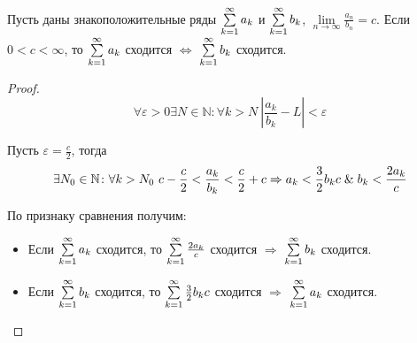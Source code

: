 \begin{theorem}
Пусть даны знакоположительные ряды $\series a_k$ и $\series b_k$, $\lim\limits_{n \to \infty} \frac{a_n}{b_n} = c$.
Если $0 < c < \infty$, то $\series a_k$ сходится $\Leftrightarrow$ $\series b_k$ сходится.
\end{theorem}
\begin{proof}
\begin{equation*}
\forall \varepsilon > 0 \exists N \in \mathbb N \colon \forall k > N \ \left| \frac{a_k}{b_k} - L \right| < \varepsilon
\end{equation*}

Пусть $\varepsilon = \frac{c}2$, тогда
\begin{equation*}
\exists N_0 \in \mathbb N \colon \forall k > N_0 \ c - \frac{c}2 < \frac{a_k}{b_k} < \frac{c}2 + c \Rightarrow
a_k < \frac32 b_k c \mathrel{\&} b_k < \frac{2 a_k}c
\end{equation*}

По признаку сравнения получим:
\begin{itemize}
	\item Если $\series a_k$ сходится, то $\series \frac{2 a_k}c$ сходится $\Rightarrow$ $\series b_k$ сходится.
	\item Если $\series b_k$ сходится, то $\series \frac32 b_k c$ сходится $\Rightarrow$ $\series a_k$ сходится.
\end{itemize}
\end{proof}

